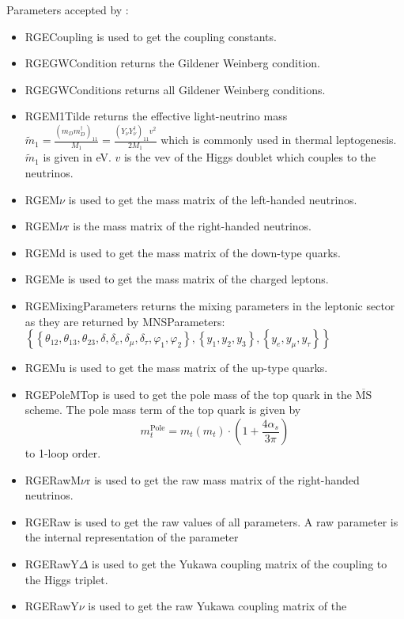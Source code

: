\documentclass[10pt,a4paper,twoside]{scrartcl}
\begin{document}
Parameters accepted by :
\begin{itemize}
\item 
RGECoupling is used to get the coupling constants.
\item 
RGEGWCondition returns the Gildener Weinberg condition.
\item 
RGEGWConditions returns all Gildener Weinberg conditions.
\item 
RGEM1Tilde returns the effective light-neutrino mass $\widetilde{m}_1 =
\frac{\left(m_D m_D^\dagger\right)_{11}}{M_1}=\frac{(Y_\nu Y_\nu^\dagger)_{11} 
v^2}{2 M_1}$ which is commonly used in thermal leptogenesis. $\widetilde{m}_1$ is
given in eV.
$v$ is the vev of the Higgs doublet which couples to the neutrinos.
\item 
RGEM$\nu$ is used to get the mass matrix of the left-handed neutrinos.
\item 
RGEM$\nu$r is the mass matrix of the right-handed neutrinos.
\item 
RGEMd is used to get the mass matrix of the down-type quarks.
\item 
RGEMe is used to get the mass matrix of the charged leptons.
\item 
RGEMixingParameters returns the mixing parameters in the leptonic sector as they
are returned by MNSParameters: $\left\{\left\{\theta_{12},\theta_{13},\theta_{23},\delta,\delta_e,\delta_\mu,\delta_\tau,\varphi_1,\varphi_2\right\},\left\{y_1,y_2,y_3\right\},\left\{y_e,y_\mu,y_\tau\right\}\right\}$
\item 
RGEMu is used to get the mass matrix of the up-type quarks.
\item 
RGEPoleMTop is used to get the pole mass of the top quark in the
$\overline{\text{MS}}$ scheme. The pole mass term of the top quark is given by
\begin{equation}
m_t^\text{Pole} = m_t(m_t) \cdot (1 + \frac{4\alpha_s}{3\pi})
\end{equation}
to 1-loop order.
\item 
RGERawM$\nu$r is used to get the raw mass matrix of the right-handed neutrinos.
\item 
RGERaw is used to get the raw values of all parameters. A raw parameter is
the internal representation of the parameter
\item 
RGERawY$\Delta$ is used to get the Yukawa coupling matrix of the coupling to the Higgs triplet.
\item 
RGERawY$\nu$ is used to get the raw Yukawa coupling matrix of the

\end{itemize}
\end{document}
